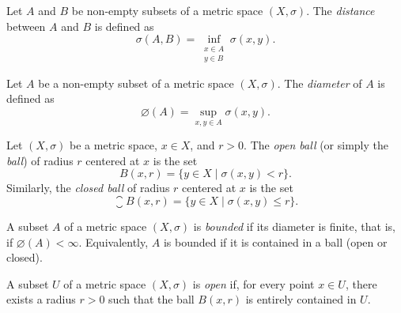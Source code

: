 \begin{definition*}
    Let $A$ and $B$ be non-empty subsets of a metric space $(X, \sigma)$. The
    \emph{distance} between $A$ and $B$ is defined as
    \begin{equation*}
        \sigma(A, B) = \inf_{\substack{x \in A \\ y \in B}} \sigma(x, y).
    \end{equation*}
\end{definition*}

\begin{definition*}
    Let $A$ be a non-empty subset of a metric space $(X, \sigma)$. The
    \emph{diameter} of $A$ is defined as
    \begin{equation*}
        \diameter(A) = \sup_{x, y \in A} \sigma(x, y).
    \end{equation*}
\end{definition*}

\begin{definition*}[Ball]
    Let $(X, \sigma)$ be a metric space, $x \in X$, and $r > 0$. The \emph{open
    ball} (or simply the \emph{ball}) of radius $r$ centered at $x$ is the set
    \begin{equation*}
        B(x, r) = \{ y \in X \mid \sigma(x, y) < r \}.
    \end{equation*}
    Similarly, the \emph{closed ball} of radius $r$ centered at $x$ is the set
    \begin{equation*}
        \closure{B}(x, r) = \{ y \in X \mid \sigma(x, y) \leq r \}.
    \end{equation*}
\end{definition*}

\begin{definition*}
    A subset $A$ of a metric space $(X, \sigma)$ is \emph{bounded} if its
    diameter is finite, that is, if $\diameter(A) < \infty$. Equivalently, $A$
    is bounded if it is contained in a ball (open or closed).
\end{definition*}

\begin{definition*}
    A subset $U$ of a metric space $(X, \sigma)$ is \emph{open} if, for every
    point $x \in U$, there exists a radius $r > 0$ such that the ball $B(x, r)$
    is entirely contained in $U$.
\end{definition*}

